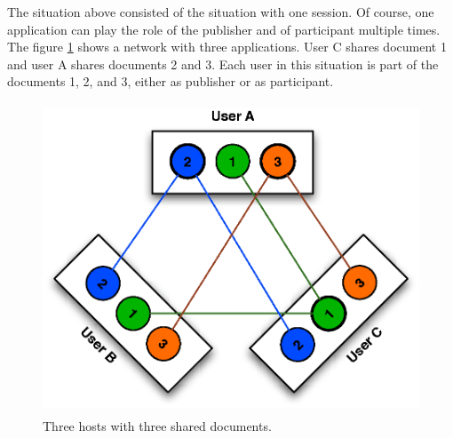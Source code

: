 \documentclass[11pt,a4paper]{article}
\begin{document}
The situation above consisted of the situation with one session. Of course, 
one application can play the role of the publisher and of participant 
multiple times. The figure \ref{fig:collaboration} shows a network with three 
applications. User C shares document 1 and user A shares documents 2 and 3. 
Each user in this situation is part of the documents 1, 2, and 3, either as 
publisher or as participant.

\begin{figure}[H]
 \centering
 \includegraphics[width=11.57cm,height=9.24cm]{../images/collaboration.eps}
 \caption{Three hosts with three shared documents.}
 \label{fig:collaboration}
\end{figure}
\end{document}
